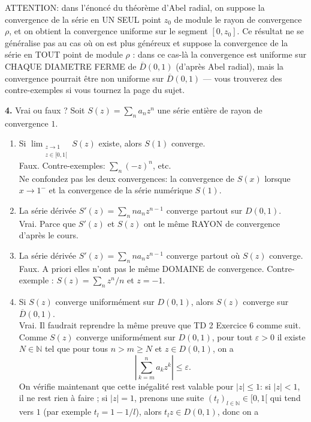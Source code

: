 \documentclass[a4paper,10pt]{article}
\newcommand{\N}{\mathbb{N}}
\newcommand{\abs}[1]{\left|#1\right|}
\newcommand{\correction}[1]{{\color{red}#1}}
\newcommand{\comment}[1]{{\color{blue}#1}}
\begin{document}
\comment{ATTENTION: dans l'énoncé du théorème d'Abel radial, on suppose la convergence de la série en UN SEUL point $z_0$ de module le rayon de convergence $\rho$, et on obtient la convergence uniforme sur le segment $[0,z_0]$. Ce résultat ne se généralise pas au cas où on est plus généreux et suppose la convergence de la série en TOUT point de module $\rho$ : dans ce cas-là la convergence est uniforme sur CHAQUE DIAMETRE FERME de $\overline{D}(0,1)$ (d'après Abel radial), mais la convergence pourrait être non uniforme sur $\overline{D}(0,1)$ --- vous trouverez des contre-exemples si vous tournez la page du sujet.}

\vspace{.1in}
\noindent
\textbf{4.}
Vrai ou faux ?
Soit $S(z)=\sum_n a_nz^n$ une série entière de rayon de convergence $1$.
\begin{enumerate}[label=\alph*)]
    \item Si $\lim_{\substack{z\to 1\\z\in[0,1[}}S(z)$ existe, alors $S(1)$ converge.\\
    \correction{Faux. Contre-exemples: $\sum_n(-z)^n$, etc.}\\
    \comment{Ne confondez pas les deux convergences: la convergence de $S(x)$ lorsque $x\to 1^-$ et la convergence de la série numérique $S(1)$.}
    \item La série dérivée $S'(z)=\sum_n na_nz^{n-1}$ converge partout sur $D(0,1)$.\\
    \correction{Vrai. Parce que $S'(z)$ et $S(z)$ ont le même RAYON de convergence d'après le cours.}
    \item La série dérivée $S'(z)=\sum_n na_nz^{n-1}$ converge partout où $S(z)$ converge.\\
    \correction{Faux. A priori elles n'ont pas le même DOMAINE de convergence. Contre-exemple : $S(z)=\sum_nz^n/n$ et $z=-1$.}
    \item Si $S(z)$ converge uniformément sur $D(0,1)$, alors $S(z)$ converge sur $\overline{D}(0,1)$.\\
    \correction{Vrai. Il faudrait reprendre la même preuve que TD 2 Exercice 6 comme suit. Comme $S(z)$ converge uniformément sur $D(0,1)$, pour tout $\varepsilon>0$ il existe $N\in\N$ tel que pour tous $n>m\geq N$ et $z\in D(0,1)$, on a
    $$\abs{\sum_{k=m}^na_kz^k}\leq\varepsilon.$$
    On vérifie maintenant que cette inégalité rest valable pour $\abs{z}\leq 1$: si $\abs{z}<1$, il ne rest rien à faire ; si $\abs{z}=1$, prenons une suite $(t_l)_{l\in\N}\in[0,1[$ qui tend vers $1$ (par exemple $t_l=1-1/l$), alors $t_lz\in D(0,1)$, donc on a
}
\end{enumerate}
\end{document}
